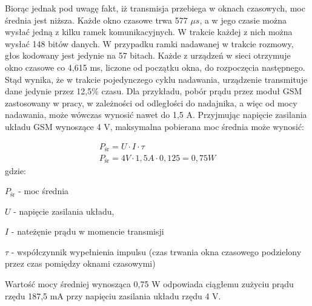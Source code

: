 Biorąc jednak pod uwagę fakt, iż transmisja przebiega w oknach czasowych, moc średnia jest niższa. Każde okno czasowe trwa 577 $\mu s$, a w jego czasie można wysłać jedną z kilku ramek komunikacyjnych. W trakcie każdej z nich można wysłać 148 bitów danych. W przypadku ramki nadawanej w trakcie rozmowy, głos kodowany jest jedynie na 57 bitach. Każde z urządzeń w sieci otrzymuje okno czasowe co 4,615 ms, liczone od początku okna, do rozpoczęcia następnego. Stąd wynika, że w trakcie pojedynczego cyklu nadawania, urządzenie transmituje dane jedynie przez 12,5\% czasu. Dla przykładu, pobór prądu przez moduł GSM zastosowany w pracy, w zależności od odległości do nadajnika, a więc od mocy nadawania, może wówczas wynosić nawet do 1,5 A. Przyjmując napięcie zasilania układu GSM wynoszące 4 V, maksymalna pobierana moc średnia może wynosić:

\begin{gather}
 	P_{\text{śr}} = U \cdot I \cdot \tau \\
 	P_{\text{śr}} = 4 V \cdot 1,5 A \cdot 0,125 = 0,75 W \nonumber 	
 	\label{eq_gsm_power_mean} 
\end{gather}
 gdzie:
 
 $P_{\text{śr}} $ - moc średnia
 
 $U$ - napięcie zasilania układu,
 
 $I$ - nateżęnie prądu w momencie transmisji
 
 $\tau$ - współczynnik wypełnienia impulsu (czas trwania okna czasowego podzielony przez czas pomiędzy oknami czasowymi)
 
Wartość mocy średniej wynosząca 0,75 W odpowiada ciągłemu zużyciu prądu rzędu 187,5 mA przy napięciu zasilania układu rzędu 4 V. 


